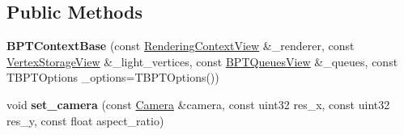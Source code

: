 \subsection*{Public Methods}
\begin{DoxyCompactItemize}
\item 
\mbox{\label{struct_b_p_t_context_base_a99d21412e9d03211d4bb7e39f36f4da2}} 
{\bfseries B\+P\+T\+Context\+Base} (const \hyperlink{struct_rendering_context_view}{Rendering\+Context\+View} \&\+\_\+renderer, const \hyperlink{struct_vertex_storage_view}{Vertex\+Storage\+View} \&\+\_\+light\+\_\+vertices, const \hyperlink{struct_b_p_t_queues_view}{B\+P\+T\+Queues\+View} \&\+\_\+queues, const T\+B\+P\+T\+Options \+\_\+options=T\+B\+P\+T\+Options())
\item 
\mbox{\label{struct_b_p_t_context_base_aa1a101747cbf03fcb7681a43519601c4}} 
void {\bfseries set\+\_\+camera} (const \hyperlink{struct_camera}{Camera} \&camera, const uint32 res\+\_\+x, const uint32 res\+\_\+y, const float aspect\+\_\+ratio)
\end{DoxyCompactItemize}
